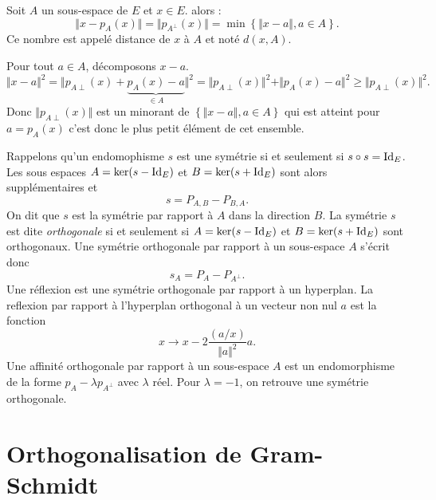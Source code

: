 \begin{prop}
 Soit $A$ un sous-espace de $E$ et $x\in E$. alors :
\begin{displaymath}
 \Vert x - p_A(x)\Vert = \Vert p_{A^\bot}(x)\Vert
=\min\left\lbrace \Vert x-a\Vert, a\in A\right\rbrace .
\end{displaymath}
Ce nombre est appelé distance de $x$ à $A$ et noté $d(x,A)$.
\end{prop}
\begin{demo}
Pour tout $a\in A$, décomposons $x-a$.
\begin{displaymath}
\Vert x - a\Vert^2=\Vert p_{A\perp}(x) + \underset{\in A}{\underbrace{p_A(x) -a}}\Vert^2  
= \Vert p_{A\perp}(x) \Vert^2 + \Vert p_A(x) -a\Vert^2 \geq \Vert p_{A\perp}(x) \Vert^2 .
\end{displaymath}
Donc $\Vert p_{A\perp}(x) \Vert$ est un minorant de $\left\lbrace \Vert x-a\Vert, a\in A\right\rbrace$ qui est atteint pour $a=p_A(x)$ c'est donc le plus petit élément de cet ensemble.
\end{demo}
Rappelons qu'un endomophisme $s$ est une symétrie si et seulement si $s\circ s = \mathop{\mathrm{Id}}_E$. Les sous espaces $A = \ker(s-\mathop{\mathrm{Id}}_E)$ et $B = \ker(s + \mathop{\mathrm{Id}}_E)$ sont alors supplémentaires et 
\[
 s = P_{A,B} - P_{B,A}.
\]
On dit que $s$ est la symétrie par  rapport à $A$ dans la direction $B$. La symétrie $s$ est dite \emph{orthogonale} si et seulement si $A = \ker(s-\mathop{\mathrm{Id}}_E)$ et $B = \ker(s + \mathop{\mathrm{Id}}_E)$ sont orthogonaux. Une symétrie orthogonale par rapport à un sous-espace $A$ s'écrit donc
\[
 s_A = P_{A} - P_{A^\bot}.
\]
Une réflexion est une symétrie orthogonale par rapport à un hyperplan.\newline
La reflexion par rapport à l'hyperplan orthogonal à un vecteur non nul $a$ est la fonction
\begin{displaymath}
 x\rightarrow x - 2\frac{(a/x)}{\Vert a\Vert^2}a.
\end{displaymath}
Une affinité orthogonale par rapport à un sous-espace $A$ est un endomorphisme de la forme $p_A - \lambda p_{A^\bot}$ avec $\lambda$ réel. Pour $\lambda = -1$, on retrouve une symétrie orthogonale. 

\section{Orthogonalisation de Gram-Schmidt}
